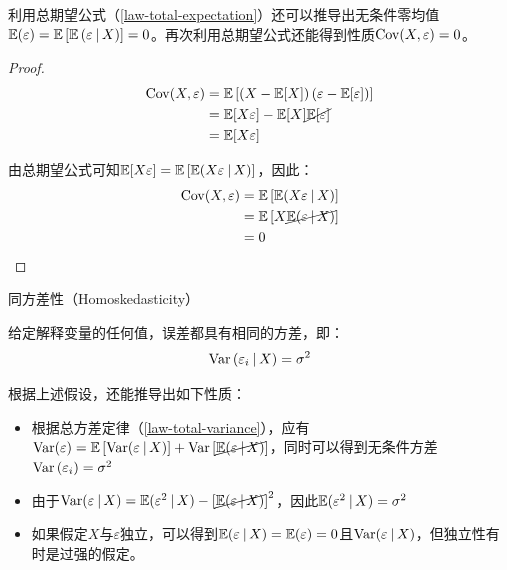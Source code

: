 \documentclass[11pt]{article}
\begin{document}
利用总期望公式（\ref{law-total-expectation}）还可以推导出无条件零均值$\mathbb{E}(\varepsilon) = \mathbb{E}\left[ \mathbb{E} \left( \varepsilon \:\vert\, X \right) \right] = 0$。再次利用总期望公式还能得到性质$\operatorname{Cov}(X,\varepsilon)=0$。
\begin{proof}
    \begin{align*}
        \operatorname{Cov}(X,\varepsilon) &= \mathbb{E}\left[ \left(X - \mathbb{E}[X]\right) \left(\varepsilon - \mathbb{E}[\varepsilon]\right)\right] \\
        &= \mathbb{E}[X\varepsilon]- \mathbb{E}[X] \cancel{\mathbb{E}[\varepsilon]} \\
        &= \mathbb{E}[X\varepsilon]
    \end{align*}

    由总期望公式可知$\mathbb{E}[X\varepsilon] = \mathbb{E}\left[\mathbb{E}(X\varepsilon \:\vert\, X)\right]$，因此：
    \begin{align*}
        \operatorname{Cov}(X,\varepsilon) &= \mathbb{E}\left[\mathbb{E}(X\varepsilon \:\vert\, X)\right] \\
        &= \mathbb{E}\left[ X \cancel{\mathbb{E}(\varepsilon \:\vert\, X)}\right] \\
        &= 0
    \end{align*}
\end{proof}

\begin{assumption}
    同方差性（Homoskedasticity）

    给定解释变量的任何值，误差都具有相同的方差，即：
    \begin{equation*}
        \operatorname{Var}\left(\varepsilon_i \:\vert\, X \right) = \sigma^2
    \end{equation*}

    \label{ols-assumnption-5}
\end{assumption}

根据上述假设，还能推导出如下性质：
\begin{itemize}
    \item 根据总方差定律（\ref{law-total-variance}），应有$\operatorname{Var}(\varepsilon) = \mathbb{E}\left[ \operatorname{Var}(\varepsilon \:\vert\, X) \right] + \operatorname{Var}\left[ \cancel{\mathbb{E}(\varepsilon \:\vert\, X)} \right]$，同时可以得到无条件方差$\operatorname{Var}\left(\varepsilon_i \right) = \sigma^2$
    \item 由于$\operatorname{Var}(\varepsilon \:\vert\, X) = \mathbb{E}(\varepsilon^2 \:\vert\, X) - \left[ \cancel{\mathbb{E}(\varepsilon \:\vert\, X)} \right]^2$，因此$\mathbb{E}(\varepsilon^2 \:\vert\, X) = \sigma^2$
    \item 如果假定$X$与$\varepsilon$独立，可以得到$\mathbb{E}(\varepsilon \:\vert\, X) = \mathbb{E}(\varepsilon) =0$且$\operatorname{Var}(\varepsilon \:\vert\, X)$，但独立性有时是过强的假定。
\end{itemize}
\end{document}
